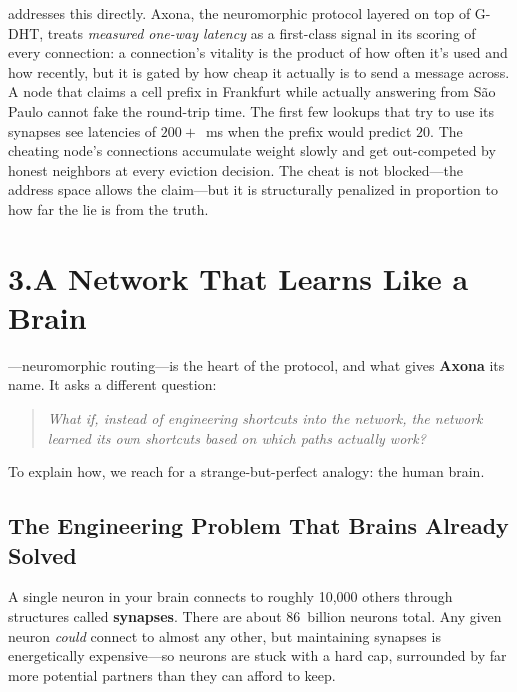 \documentclass[nobib,justified]{tufte-handout}
\begin{document}
 addresses this directly. Axona, the neuromorphic protocol layered on top of G-DHT, treats \emph{measured one-way latency} as a first-class signal in its scoring of every connection: a connection's vitality is the product of how often it's used and how recently, but it is gated by how cheap it actually is to send a message across. A node that claims a cell prefix in Frankfurt while actually answering from S\~ao Paulo cannot fake the round-trip time. The first few lookups that try to use its synapses see latencies of $200+$~ms when the prefix would predict $20$. The cheating node's connections accumulate weight slowly and get out-competed by honest neighbors at every eviction decision. The cheat is not blocked---the address space allows the claim---but it is structurally penalized in proportion to how far the lie is from the truth.

\section{3.\quad A Network That Learns Like a Brain}

---neuromorphic routing---is the heart of the protocol, and what gives \textbf{Axona} its name. It asks a different question:

\begin{quote}
\itshape What if, instead of engineering shortcuts into the network, the network learned its own shortcuts based on which paths actually work?
\end{quote}

To explain how, we reach for a strange-but-perfect analogy: the human brain.

\subsection{The Engineering Problem That Brains Already Solved}

A single neuron in your brain connects to roughly 10{,}000 others through structures called \textbf{synapses}. There are about 86~billion neurons total. Any given neuron \emph{could} connect to almost any other, but maintaining synapses is energetically expensive---so neurons are stuck with a hard cap, surrounded by far more potential partners than they can afford to keep.
\end{document}
